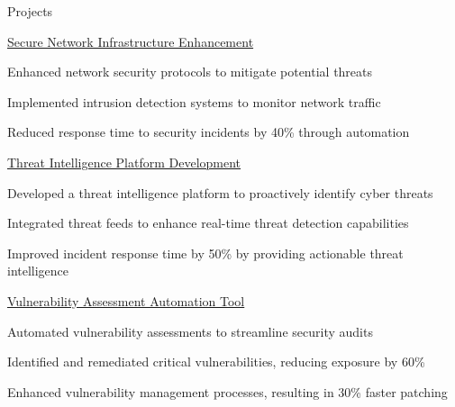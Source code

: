 \documentclass{resume} %
\begin{document}
    \begin{rSection}{Projects}
                    \begin{rSubsection}
                                    {\href{https://github.com/secure\_network\_project}{Secure Network Infrastructure Enhancement}}
                                {}{}{}
                                    \item Enhanced network security protocols to mitigate potential threats
                                    \item Implemented intrusion detection systems to monitor network traffic
                                    \item Reduced response time to security incidents by 40\% through automation
                            \end{rSubsection}
                    \begin{rSubsection}
                                    {\href{https://github.com/threat\_intel\_project}{Threat Intelligence Platform Development}}
                                {}{}{}
                                    \item Developed a threat intelligence platform to proactively identify cyber threats
                                    \item Integrated threat feeds to enhance real{-}time threat detection capabilities
                                    \item Improved incident response time by 50\% by providing actionable threat intelligence
                            \end{rSubsection}
                    \begin{rSubsection}
                                    {\href{https://github.com/vulnerability\_tool\_project}{Vulnerability Assessment Automation Tool}}
                                {}{}{}
                                    \item Automated vulnerability assessments to streamline security audits
                                    \item Identified and remediated critical vulnerabilities, reducing exposure by 60\%
                                    \item Enhanced vulnerability management processes, resulting in 30\% faster patching
                            \end{rSubsection}
            \end{rSection}
\end{document}
